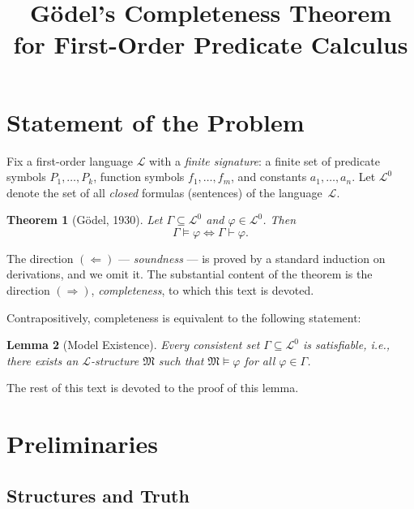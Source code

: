 \documentclass[12pt, a4paper]{article}
\theoremstyle{plain}
\newtheorem{theorem}{Theorem}
\newtheorem{lemma}[theorem]{Lemma}
\theoremstyle{definition}
\newcommand{\proves}{\vdash}
\renewcommand{\models}{\vDash}
\newcommand{\Lang}{\mathcal{L}}
\newcommand{\Struct}{\mathfrak{M}}
\begin{document}
\title{\textbf{G\"odel's Completeness Theorem\\
for First-Order Predicate Calculus}}
\author{}
\date{}
\maketitle
\tableofcontents
\bigskip

\section{Statement of the Problem}

Fix a first-order language $\Lang$ with a \emph{finite signature}:
a finite set of predicate symbols $P_1,\ldots,P_k$,
function symbols $f_1,\ldots,f_m$, and constants $a_1,\ldots,a_n$.
Let $\Lang^0$ denote the set of all \emph{closed} formulas (sentences) of the language~$\Lang$.

\begin{theorem}[G\"odel, 1930]\label{thm:completeness}
Let $\Gamma \subseteq \Lang^0$ and $\varphi \in \Lang^0$. Then
\[
  \Gamma \models \varphi \iff \Gamma \proves \varphi.
\]
\end{theorem}

The direction $(\Leftarrow)$ --- \emph{soundness} --- is proved by a standard induction
on derivations, and we omit it. The substantial content of the theorem is the
direction $(\Rightarrow)$, \emph{completeness}, to which this text is devoted.

Contrapositively, completeness is equivalent to the following statement:

\begin{lemma}[Model Existence]\label{lem:model-existence}
Every consistent set $\Gamma \subseteq \Lang^0$ is satisfiable,
i.e., there exists an $\Lang$-structure $\Struct$ such that $\Struct \models \varphi$
for all $\varphi \in \Gamma$.
\end{lemma}

The rest of this text is devoted to the proof of this lemma.

\section{Preliminaries}

\subsection{Structures and Truth}
\end{document}
